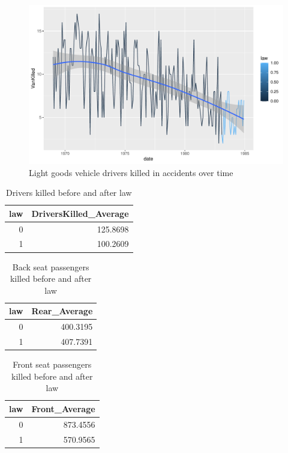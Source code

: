 \documentclass[11pt,a4paper,]{article}
\begin{document}
\begin{figure}
\centering
\includegraphics{report_files/figure-latex/VanKilled-1.pdf}
\caption{\label{fig:VanKilled}Light goods vehicle drivers killed in accidents over time}
\end{figure}

\begin{table}

\caption{\label{tab:DriverTable}Drivers killed before and after law}
\centering
\begin{tabular}[t]{r|r}
\hline
law & DriversKilled\_Average\\
\hline
0 & 125.8698\\
\hline
1 & 100.2609\\
\hline
\end{tabular}
\end{table}

\begin{table}

\caption{\label{tab:RearTable}Back seat passengers killed before and after law}
\centering
\begin{tabular}[t]{r|r}
\hline
law & Rear\_Average\\
\hline
0 & 400.3195\\
\hline
1 & 407.7391\\
\hline
\end{tabular}
\end{table}

\begin{table}

\caption{\label{tab:FrontTable}Front seat passengers killed before and after law}
\centering
\begin{tabular}[t]{r|r}
\hline
law & Front\_Average\\
\hline
0 & 873.4556\\
\hline
1 & 570.9565\\
\hline
\end{tabular}
\end{table}
\end{document}
